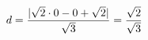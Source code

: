 \documentclass[preview]{standalone}
\begin{document}
\begin{align*}
\special{dvisvgm:raw <g id='unique000'>}d=\frac{|\sqrt{2}\cdot0-0+\sqrt{2}|}{\sqrt{3}}=\frac{\sqrt{2}}{\sqrt{3}}\special{dvisvgm:raw </g>}
\end{align*}
\end{document}
